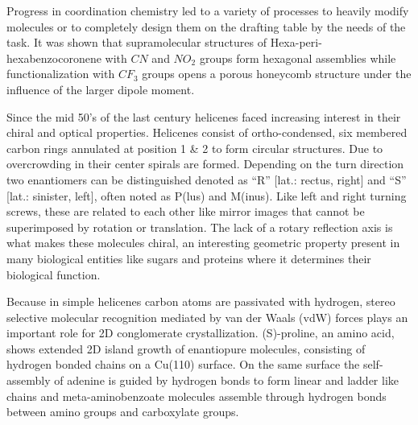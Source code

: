 Progress in coordination chemistry led to a variety of processes to heavily modify molecules or to completely design them on the drafting table by the needs of the task. It was shown that supramolecular structures of Hexa-peri-hexabenzocoronene with $CN$ and $NO_2$ groups form hexagonal assemblies while functionalization with $CF_3$ groups opens a porous honeycomb structure under the influence of the larger dipole moment.\cite{Mu_Effect_2011}

Since the mid 50’s of the last century helicenes faced increasing interest in their chiral and optical properties.\cite{Newman_synthesis_1956, Rau_Exciplex_1992, Donckt_Flourescence_1968} Helicenes consist of ortho-condensed, six membered carbon rings annulated at position 1 \& 2 to form circular structures. Due to overcrowding in their center spirals are formed. Depending on the turn direction two enantiomers can be distinguished denoted as “R” [lat.: rectus, right] and “S” [lat.: sinister, left], often noted as P(lus) and M(inus). Like left and right turning screws, these are related to each other like mirror images that cannot be superimposed by rotation or translation. The lack of a rotary reflection axis is what makes these molecules chiral, an interesting geometric property present in many biological entities like sugars and proteins where it determines their biological function. 

Because in simple helicenes carbon atoms are passivated with hydrogen, stereo selective molecular recognition mediated by van der Waals (vdW) forces plays an important role for 2D conglomerate crystallization.\cite{Treier_aromatic_2008} (S)-proline, an amino acid, shows extended 2D island growth of enantiopure molecules, consisting of hydrogen bonded chains on a Cu(110) surface.\cite{Forster_Probing_2009} On the same surface the self-assembly of adenine is guided by hydrogen bonds to form linear and ladder like chains\cite{Cheng_Role_2016} and meta-aminobenzoate molecules assemble through hydrogen bonds between amino groups and carboxylate groups.\cite{Rabot_Self-assembly_2009}

